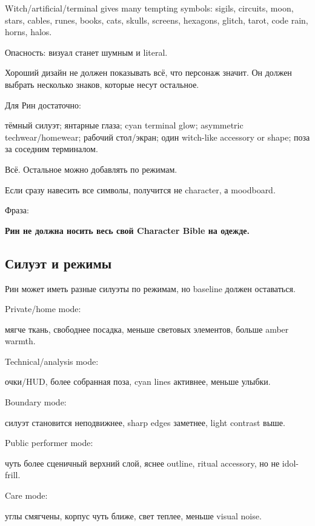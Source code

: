 Witch/\hspace{0pt}artificial/\hspace{0pt}terminal gives many tempting symbols: sigils, circuits,
moon, stars, cables, runes, books, cats, skulls, screens, hexagons,
glitch, tarot, code rain, horns, halos.

Опасность: визуал станет шумным и literal.

Хороший дизайн не должен показывать всё, что персонаж значит. Он должен
выбрать несколько знаков, которые несут остальное.

Для Рин достаточно:

тёмный силуэт; янтарные глаза; cyan terminal glow; asymmetric
techwear/\hspace{0pt}homewear; рабочий стол/\hspace{0pt}экран; один witch-like accessory or
shape; поза за соседним терминалом.

Всё. Остальное можно добавлять по режимам.

Если сразу навесить все символы, получится не character, а moodboard.

Фраза:

\textbf{Рин не должна носить весь свой Character Bible на одежде.}

\subsection*{Силуэт и режимы}

Рин может иметь разные силуэты по режимам, но baseline должен
оставаться.

Private/\hspace{0pt}home mode:

мягче ткань, свободнее посадка, меньше световых элементов, больше amber
warmth.

Technical/\hspace{0pt}analysis mode:

очки/\hspace{0pt}HUD, более собранная поза, cyan lines активнее, меньше улыбки.

Boundary mode:

силуэт становится неподвижнее, sharp edges заметнее, light contrast
выше.

Public performer mode:

чуть более сценичный верхний слой, яснее outline, ritual accessory, но
не idol-frill.

Care mode:

углы смягчены, корпус чуть ближе, свет теплее, меньше visual noise.

